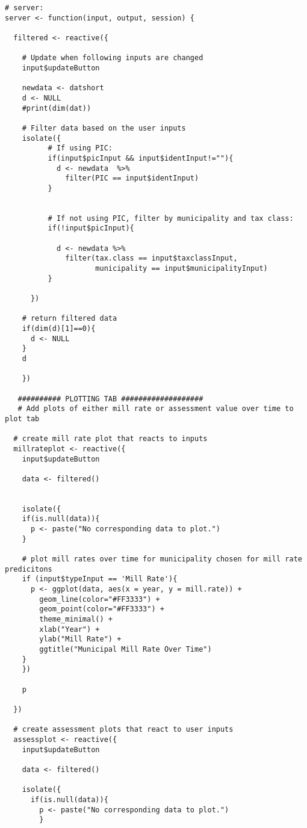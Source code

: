 \documentclass{article}
\begin{document}
\begin{lstlisting}[style=R, caption={Code used for the Shiny app.}, captionpos=b]
# server:
server <- function(input, output, session) {
  
  filtered <- reactive({
    
    # Update when following inputs are changed
    input$updateButton
    
    newdata <- datshort
    d <- NULL
    #print(dim(dat))
    
    # Filter data based on the user inputs
    isolate({
          # If using PIC:
          if(input$picInput && input$identInput!=""){
            d <- newdata  %>% 
              filter(PIC == input$identInput)
          }
          
          
          # If not using PIC, filter by municipality and tax class:
          if(!input$picInput){
            
            d <- newdata %>% 
              filter(tax.class == input$taxclassInput,
                     municipality == input$municipalityInput)
          }
      
      })
    
    # return filtered data
    if(dim(d)[1]==0){
      d <- NULL
    }
    d
    
    })
  
   ########## PLOTTING TAB ###################
   # Add plots of either mill rate or assessment value over time to plot tab
  
  # create mill rate plot that reacts to inputs
  millrateplot <- reactive({
    input$updateButton
    
    data <- filtered()
    
          
    isolate({
    if(is.null(data)){
      p <- paste("No corresponding data to plot.")
    }

    # plot mill rates over time for municipality chosen for mill rate predicitons
    if (input$typeInput == 'Mill Rate'){
      p <- ggplot(data, aes(x = year, y = mill.rate)) +
        geom_line(color="#FF3333") +
        geom_point(color="#FF3333") +
        theme_minimal() +
        xlab("Year") +
        ylab("Mill Rate") +
        ggtitle("Municipal Mill Rate Over Time")
    }
    })

    p

  })

  # create assessment plots that react to user inputs
  assessplot <- reactive({
    input$updateButton
    
    data <- filtered()

    isolate({
      if(is.null(data)){
        p <- paste("No corresponding data to plot.")
        }
      

\end{lstlisting}
\end{document}
